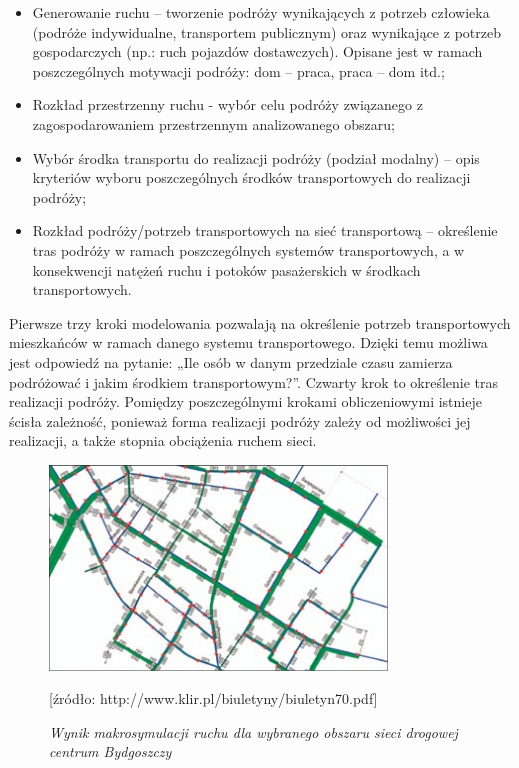 \documentclass{sprawozdanie-agh}
\begin{document}
	\begin{itemize}
		\item  Generowanie ruchu – tworzenie podróży wynikających z potrzeb człowieka (podróże indywidualne, transportem publicznym) oraz wynikające z potrzeb gospodarczych (np.: ruch pojazdów dostawczych). Opisane jest w ramach poszczególnych motywacji podróży: dom – praca, praca – dom itd.;
		\item Rozkład przestrzenny ruchu - wybór celu podróży związanego z zagospodarowaniem przestrzennym analizowanego obszaru;
		\item Wybór środka transportu do realizacji podróży (podział modalny) – opis kryteriów wyboru poszczególnych środków transportowych do realizacji podróży;
		\item Rozkład podróży/potrzeb transportowych na sieć transportową – określenie tras podróży w ramach poszczególnych systemów transportowych, a w konsekwencji natężeń ruchu i potoków pasażerskich w środkach transportowych.
	\end{itemize}

	Pierwsze trzy kroki modelowania pozwalają na określenie potrzeb transportowych mieszkańców w ramach danego systemu transportowego. Dzięki temu możliwa jest odpowiedź na pytanie: „Ile osób w danym przedziale czasu zamierza podróżować i jakim środkiem transportowym?”. Czwarty krok to określenie tras realizacji podróży. Pomiędzy poszczególnymi krokami obliczeniowymi istnieje ścisła zależność, ponieważ forma realizacji podróży zależy od możliwości jej realizacji, a także stopnia obciążenia ruchem sieci.

	\begin{figure}[H]
		\centering
		\includegraphics[width=0.8\textwidth]{Makrosymulacja.jpg}
		\caption{\textit{Wynik makrosymulacji ruchu dla wybranego obszaru sieci drogowej centrum Bydgoszczy}}
		[źródło: http://www.klir.pl/biuletyny/biuletyn70.pdf]
		\label{fig:Makrosymulacja}
	\end{figure}
\end{document}
